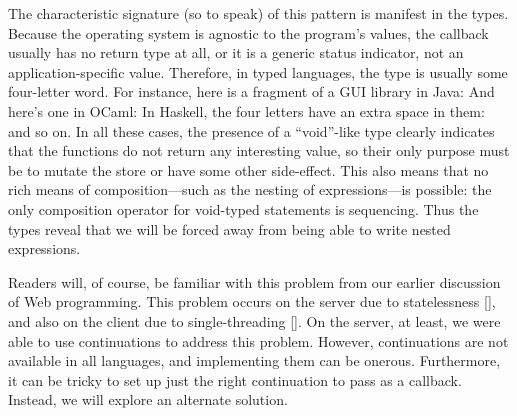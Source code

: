 
The characteristic signature (so to speak) of this pattern is manifest in the
types. Because the operating system is agnostic to the program’s values, the
callback usually has no return type at all, or it is a generic status indicator,
not an application-specific value. Therefore, in typed languages, the type is
usually some four-letter word. For instance, here is a fragment of a GUI library
in Java:
And here’s one in OCaml:
In Haskell, the four letters have an extra space in them:
and so on. In all these cases, the presence of a “void”-like type clearly
indicates that the functions do not return any interesting value, so their only
purpose must be to mutate the store or have some other side-effect. This also
means that no rich means of composition—such as the nesting of expressions—is
possible: the only composition operator for void-typed statements is sequencing.
Thus the types reveal that we will be forced away from being able to write
nested expressions.

Readers will, of course, be familiar with this problem from our earlier
discussion of Web programming. This problem occurs on the server due to
statelessness \ref{}, and also on the client due to single-threading \ref{}. On
the server, at least, we were able to use continuations to address this problem.
However, continuations are not available in all languages, and implementing them
can be onerous. Furthermore, it can be tricky to set up just the right
continuation to pass as a callback. Instead, we will explore an alternate
solution.
